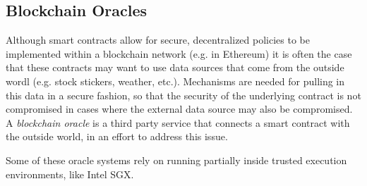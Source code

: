 \documentclass[10pt,a4paper]{article}
\begin{document}



\subsection{Blockchain Oracles}

Although smart contracts allow for secure, decentralized policies to be implemented within a blockchain network (e.g. in Ethereum) it is often the case that these contracts may want to use data sources that come from the outside wordl (e.g. stock stickers, weather, etc.). Mechanisms are needed for pulling in this data in a secure fashion, so that the security of the underlying contract is not compromised in cases where the external data source may also be compromised. A \textit{blockchain oracle} \cite{2016towncrier,breidenbach2021chainlink} is a third party service that connects a smart contract with the outside world, in an effort to address this issue.

Some of these oracle systems \cite{2016towncrier} rely on running partially inside trusted execution environments, like Intel SGX.





\end{document}
